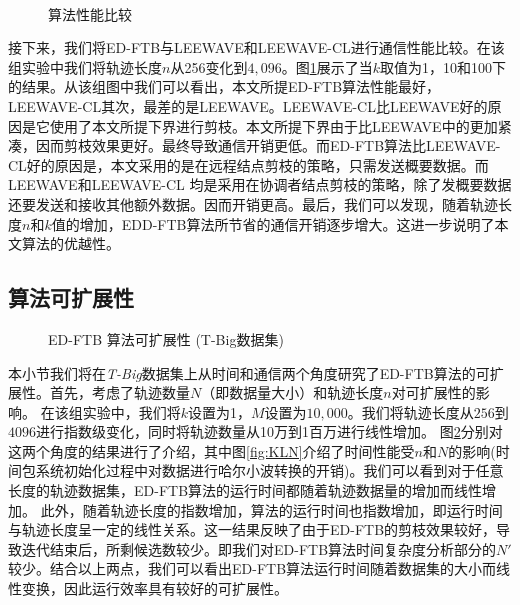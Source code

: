 \begin{figure}[t]
\centering
{}
\\
\caption{算法性能比较}
\label{fig:costCmp}
\end{figure}
接下来，我们将ED-FTB与LEEWAVE和LEEWAVE-CL进行通信性能比较。在该组实验中我们将轨迹长度$n$从256变化到$4,096$。图\ref{fig:costCmp}展示了当$k$取值为1，10和100下的结果。从该组图中我们可以看出，本文所提ED-FTB算法性能最好，LEEWAVE-CL其次，最差的是LEEWAVE。LEEWAVE-CL比LEEWAVE好的原因是它使用了本文所提下界进行剪枝。本文所提下界由于比LEEWAVE中的更加紧凑，因而剪枝效果更好。最终导致通信开销更低。而ED-FTB算法比LEEWAVE-CL好的原因是，本文采用的是在远程结点剪枝的策略，只需发送概要数据。而LEEWAVE和LEEWAVE-CL 均是采用在协调者结点剪枝的策略，除了发概要数据还要发送和接收其他额外数据。因而开销更高。最后，我们可以发现，随着轨迹长度$n$和$k$值的增加，EDD-FTB算法所节省的通信开销逐步增大。这进一步说明了本文算法的优越性。

\subsection{算法可扩展性}
\begin{figure} [t]
	\centering
	\caption{ED-FTB 算法可扩展性 {(T-Big数据集)}}
	\label{fig:EDScalability}
\end{figure}

 本小节我们将在\emph{T-Big}数据集上从时间和通信两个角度研究了ED-FTB算法的可扩展性。首先，考虑了轨迹数量$N$（即数据量大小）和轨迹长度$n$对可扩展性的影响。
在该组实验中，我们将$k$设置为1，$M$设置为$10,000$。我们将轨迹长度从$256$到$4096$进行指数级变化，同时将轨迹数量从10万到1百万进行线性增加。
  图\ref{fig:EDScalability}分别对这两个角度的结果进行了介绍，其中图\ref{fig:KLN}介绍了时间性能受$n$和$N$的影响(时间包系统初始化过程中对数据进行哈尔小波转换的开销)。我们可以看到对于任意长度的轨迹数据集，ED-FTB算法的运行时间都随着轨迹数据量的增加而线性增加。
  此外，随着轨迹长度的指数增加，算法的运行时间也指数增加，即运行时间与轨迹长度呈一定的线性关系。这一结果反映了由于ED-FTB的剪枝效果较好，导致迭代结束后，所剩候选数较少。即我们对ED-FTB算法时间复杂度分析部分的$N'$较少。结合以上两点，我们可以看出ED-FTB算法运行时间随着数据集的大小而线性变换，因此运行效率具有较好的可扩展性。

